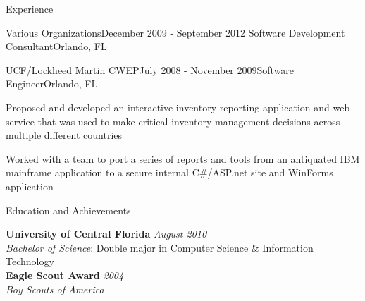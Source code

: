 \documentclass{resume} %
\begin{document}
\begin{rSection}{Experience}
\begin{rSubsection}{Various Organizations}{December 2009 - September 2012}{ Software Development Consultant}{Orlando, FL}
\end{rSubsection}


\begin{rSubsection}{UCF/Lockheed Martin CWEP}{July 2008 - November 2009}{Software Engineer}{Orlando, FL}

\item Proposed and developed an interactive inventory reporting application and  web service that was used to make critical inventory management decisions across multiple different countries 
\item Worked with a team to port a series of reports and tools from an antiquated IBM mainframe application to a secure internal C\#/ASP.net site and WinForms application 

\end{rSubsection}


\end{rSection}


\begin{rSection}{Education and Achievements}

{\bf University of Central Florida} \hfill {\em August 2010} \\ 
\textit{Bachelor of Science}: Double major in Computer Science \& Information Technology \\
{\bf Eagle Scout Award} \hfill {\em 2004} \\ 
\textit{Boy Scouts of America} \\
\end{rSection}





\end{document}
